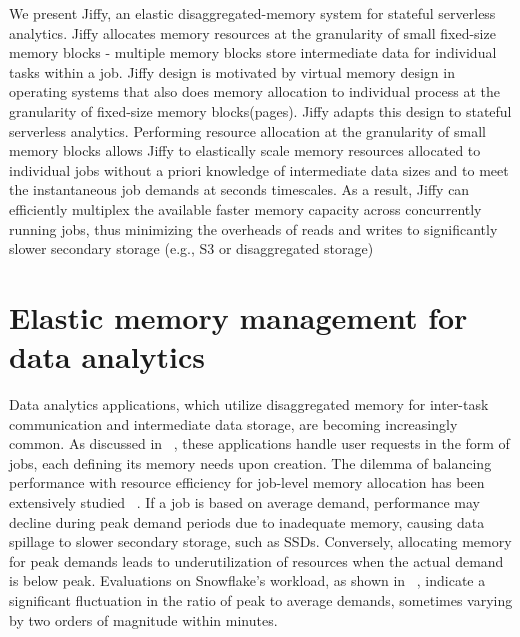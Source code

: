 We present Jiffy, an elastic disaggregated-memory system for stateful serverless analytics. Jiffy allocates memory resources at the granularity of small fixed-size memory blocks - multiple memory blocks store intermediate data for individual tasks within a job. Jiffy design is motivated by virtual memory design in operating systems that also does memory allocation to individual process at the granularity of fixed-size memory blocks(pages). Jiffy adapts this design to stateful serverless analytics. Performing resource allocation at the granularity of small memory blocks allows Jiffy to elastically scale memory resources allocated to individual jobs without a priori knowledge of intermediate data sizes and to meet the instantaneous job demands at seconds timescales. As a result, Jiffy can efficiently multiplex the available faster memory capacity across concurrently running jobs, thus minimizing the overheads of reads and writes to significantly slower secondary storage (e.g., S3 or disaggregated storage)

\section{Elastic memory management for data analytics}

Data analytics applications, which utilize disaggregated memory for inter-task communication and intermediate data storage, are becoming increasingly common. As discussed in ~\cite{starling, shuffling, pocket, cirrus}, these applications handle user requests in the form of jobs, each defining its memory needs upon creation. The dilemma of balancing performance with resource efficiency for job-level memory allocation has been extensively studied ~\cite{elasticquery, qoop}. If a job is based on average demand, performance may decline during peak demand periods due to inadequate memory, causing data spillage to slower secondary storage, such as SSDs. Conversely, allocating memory for peak demands leads to underutilization of resources when the actual demand is below peak. Evaluations on Snowflake's workload, as shown in ~\cite{elasticquery}, indicate a significant fluctuation in the ratio of peak to average demands, sometimes varying by two orders of magnitude within minutes.

